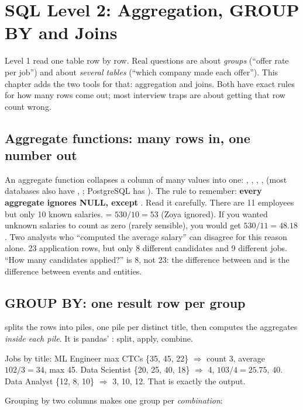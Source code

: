 \chapter{SQL Level 2: Aggregation, GROUP BY and Joins}

Level 1 read one table row by row. Real questions are about \emph{groups} (``offer rate per job'') and about \emph{several tables} (``which company made
each offer''). This chapter adds the two tools for that: aggregation and joins. Both have exact rules for how many rows come out; most interview traps
are about getting that row count wrong.

\section{Aggregate functions: many rows in, one number out}
An aggregate function collapses a column of many values into one: , , , ,  (most databases also
have , ; PostgreSQL has ). The rule to remember: \textbf{every aggregate ignores NULL, except
}.
Read it carefully. There are 11 employees but only 10 known salaries.  = $530/10 = 53$ (Zoya ignored). If you wanted unknown salaries to count
as zero (rarely sensible), you would get $530/11 = 48.18$. Two analysts who ``computed the average salary'' can disagree for this reason alone.
23 application rows, but only 8 different candidates and 9 different jobs. ``How many candidates applied?'' is 8, not 23: the difference between
 and  is the difference between events and entities.

\section{GROUP BY: one result row per group}
 splits the rows into piles, one pile per distinct title, then computes the aggregates \emph{inside each pile}. It is pandas'
: split, apply, combine.
\begin{example}[: do it by hand]
Jobs by title: ML Engineer max CTCs \{35, 45, 22\} $\Rightarrow$ count 3, average $102/3 = 34$, max 45. Data Scientist \{20, 25, 40, 18\} $\Rightarrow$
4, $103/4 = 25.75$, 40. Data Analyst \{12, 8, 10\} $\Rightarrow$ 3, 10, 12. That is exactly the output.
\end{example}
Grouping by two columns makes one group per \emph{combination}:

